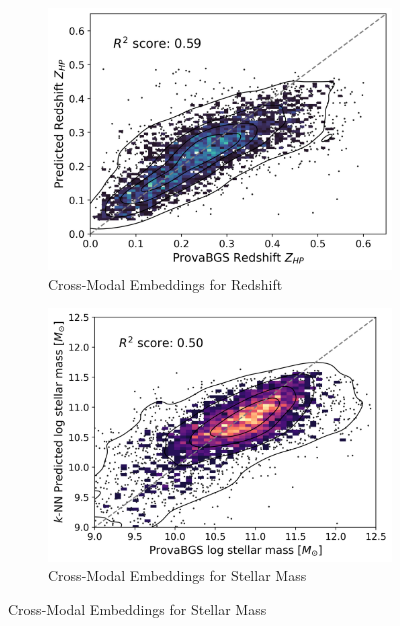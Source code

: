 \documentclass[draft, a4paper,12pt]{article}
\begin{document}
\begin{figure}[H]
    \begin{subfigure}[b]{0.48\textwidth}
        \centering
        \includegraphics[width=\textwidth]{../figures/zeroshot_redshift_crossmodal.png}
        \caption{Cross-Modal Embeddings for Redshift}
        \label{fig:redshift_crossmodal}
    \end{subfigure}%
    \hfill
    \begin{subfigure}[b]{0.48\textwidth}
        \centering
        \includegraphics[width=\textwidth]{../figures/zeroshot_stellarmass_crossmodal.png}
        \caption{Cross-Modal Embeddings for Stellar Mass}
        \label{fig:stellarmass_crossmodal}
    \end{subfigure}


\end{figure}
\end{document}
